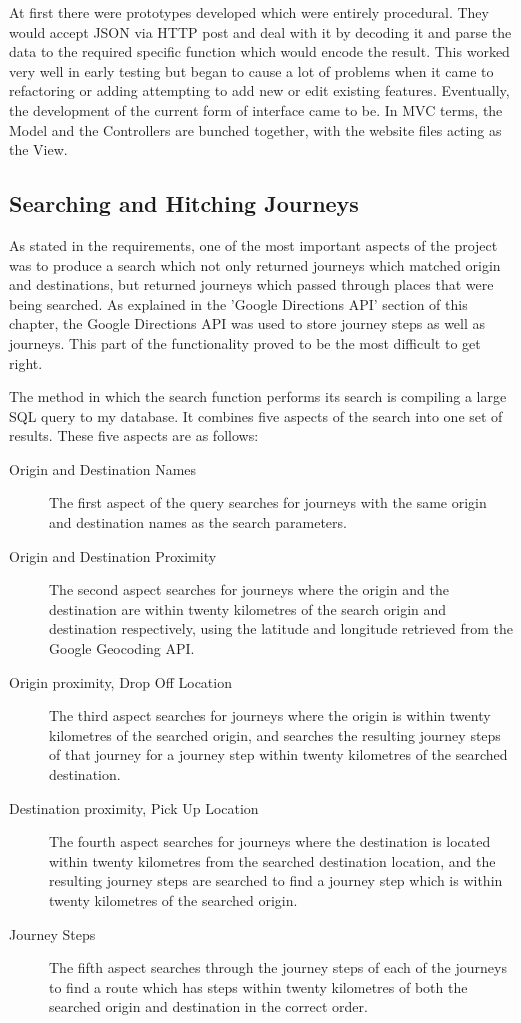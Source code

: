 	At first there were prototypes developed which were entirely procedural. They would accept JSON via HTTP post and deal with it by decoding it and parse the data to the required specific function which would encode the result. This worked very well in early testing but began to cause a lot of problems when it came to refactoring or adding attempting to add new or edit existing features. Eventually, the development of the current form of interface came to be. In MVC terms, the Model and the Controllers are bunched together, with the website files acting as the View.

\subsection{Searching and Hitching Journeys}
As stated in the requirements, one of the most important aspects of the project was to produce a search which not only returned journeys which matched origin and destinations, but returned journeys which passed through places that were being searched. As explained in the 'Google Directions API' section of this chapter, the Google Directions API was used to store journey steps as well as journeys. This part of the functionality proved to be the most difficult to get right.

The method in which the search function performs its search is compiling a large SQL query to my database. It combines five aspects of the search into one set of results. These five aspects are as follows:

\begin{description}
\item[Origin and Destination Names] The first aspect of the query searches for journeys with the same origin and destination names as the search parameters. 
\item[Origin and Destination Proximity] The second aspect searches for journeys where the origin and the destination are within twenty kilometres of the search origin and destination respectively, using the latitude and longitude retrieved from the Google Geocoding API.
\item[Origin proximity, Drop Off Location] The third aspect searches for journeys where the origin is within twenty kilometres of the searched origin, and searches the resulting journey steps of that journey for a journey step within twenty kilometres of the searched destination.
\item[Destination proximity, Pick Up Location] The fourth aspect searches for journeys where the destination is located within twenty kilometres from the searched destination location, and the resulting journey steps are searched to find a journey step which is within twenty kilometres of the searched origin.
\item[Journey Steps] The fifth aspect searches through the journey steps of each of the journeys to find a route which has steps within twenty kilometres of both the searched origin and destination in the correct order.
\end{description}

